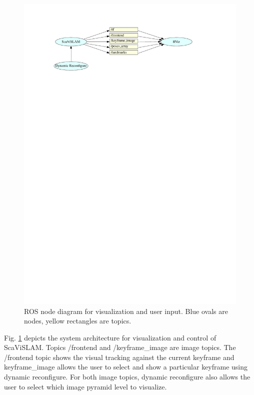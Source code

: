 \begin{figure}[h]
  \centering
    \includegraphics[width=1.0\textwidth]{chapters/images/visualization_architecture}
  \caption{ROS node diagram for visualization and user input.  Blue ovals are nodes, yellow rectangles are topics.} 
  \label{fig:visualization_architecture}
\end{figure}

Fig. \ref{fig:visualization_architecture} depicts the system architecture for visualization and control of ScaViSLAM.  Topics /frontend and /keyframe\_image are image topics.  The /frontend topic shows the visual tracking against the current keyframe and keyframe\_image allows the user to select and show a particular keyframe using dynamic reconfigure.  For both image topics, dynamic reconfigure also allows the user to select which image pyramid level to visualize.

